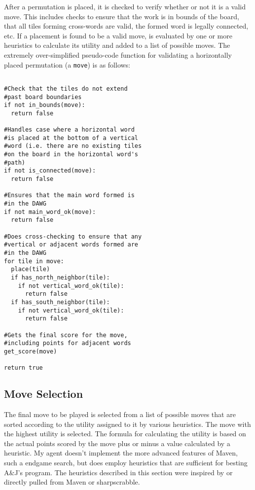 \documentclass[letterpaper]{article}
\begin{document}
After a permutation is placed, it is checked to verify whether or not it is a valid move. This includes checks to ensure that the work is in bounds of the board, that all tiles forming cross-words are valid, the formed word is legally connected, etc. If a placement is found to be a valid move, is evaluated by one or more heuristics to calculate its utility and added to a list of possible moves. The extremely over-simplified pseudo-code function for validating a horizontally placed permutation (a \texttt{move}) is as follows:

\lstset{language=Python}
\begin{lstlisting}[frame=single, breaklines=true]  % Start your code-block

#Check that the tiles do not extend
#past board boundaries
if not in_bounds(move):
  return false
  
#Handles case where a horizontal word
#is placed at the bottom of a vertical
#word (i.e. there are no existing tiles
#on the board in the horizontal word's
#path)
if not is_connected(move):
  return false

#Ensures that the main word formed is
#in the DAWG
if not main_word_ok(move):
  return false

#Does cross-checking to ensure that any
#vertical or adjacent words formed are
#in the DAWG
for tile in move:
  place(tile)
  if has_north_neighbor(tile):
    if not vertical_word_ok(tile):
      return false
  if has_south_neighbor(tile):
    if not vertical_word_ok(tile):
      return false

#Gets the final score for the move,
#including points for adjacent words   
get_score(move)

return true
\end{lstlisting}

\subsection{Move Selection}
The final move to be played is selected from a list of possible moves that are sorted according to the utility assigned to it by various heuristics. The move with the highest utility is selected. The formula for calculating the utility is based on the actual points scored by the move plus or minus a value calculated by a heuristic. My agent doesn't implement the more advanced features of Maven, such a endgame search, but does employ heuristics that are sufficient for besting A\&J's program. The heuristics described in this section were inspired by or directly  pulled from Maven or sharpscrabble.
\end{document}
